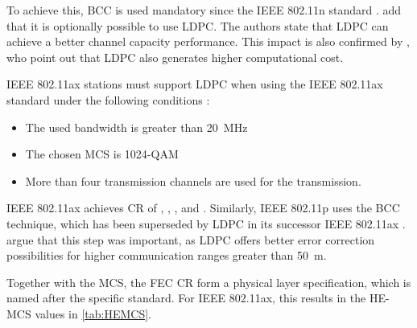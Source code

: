 To achieve this, \ac{BCC} is used mandatory since the IEEE 802.11n standard \cite{afaqui_ieee_2017,syafei_performance_2009}
. \textcite{syafei_performance_2009} add that it is optionally possible to
use \ac{LDPC}.
The authors state that \ac{LDPC} can achieve a better channel capacity performance.
This impact is also confirmed by \textcite{afaqui_ieee_2017}, who point out that \ac{LDPC} also generates higher computational cost.

IEEE 802.11ax stations must support \ac{LDPC} when using the IEEE 802.11ax standard under
the following conditions \cite{afaqui_ieee_2017,noauthor_ieee_2021} :
\begin{itemize}
   \item The used bandwidth is greater than \SI{20}{\mega\hertz}
   \item The chosen \ac{MCS} is \num{1024}-\ac{QAM}
   \item More than four transmission channels are used for the transmission.
\end{itemize}
IEEE 802.11ax achieves \ac{CR} of , , , and  \cite{noauthor_ieee_2021}.
Similarly, IEEE 802.11p uses the \ac{BCC} technique, which has been superseded by \ac{LDPC} in its successor
IEEE 802.11ax \cite{jacob_system-level_2020,krief_analysis_2020}.
\textcite{krief_analysis_2020} argue that this step was important, as \ac{LDPC} offers better error correction
possibilities for higher communication ranges greater than \SI{50}{\metre}.

Together with the \ac{MCS}, the \ac{FEC} \ac{CR} form a physical layer specification, which is named after the specific standard.
For IEEE 802.11ax, this results in the HE-MCS values in \autoref{tab:HEMCS}.

